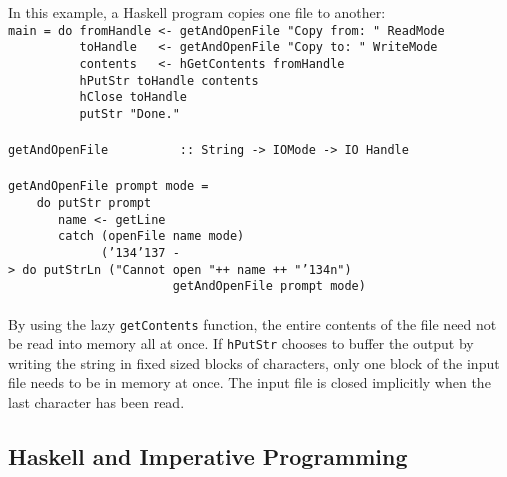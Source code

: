 In this example, a Haskell program copies one file to another:
\bprog
\mbox{\tt main\ =\ do\ fromHandle\ <-\ getAndOpenFile\ "Copy\ from:\ "\ ReadMode}\\
\mbox{\tt \ \ \ \ \ \ \ \ \ \ toHandle\ \ \ <-\ getAndOpenFile\ "Copy\ to:\ "\ WriteMode\ }\\
\mbox{\tt \ \ \ \ \ \ \ \ \ \ contents\ \ \ <-\ hGetContents\ fromHandle}\\
\mbox{\tt \ \ \ \ \ \ \ \ \ \ hPutStr\ toHandle\ contents}\\
\mbox{\tt \ \ \ \ \ \ \ \ \ \ hClose\ toHandle}\\
\mbox{\tt \ \ \ \ \ \ \ \ \ \ putStr\ "Done."}\\
\mbox{\tt }\\[-8pt]
\mbox{\tt getAndOpenFile\ \ \ \ \ \ \ \ \ \ ::\ String\ ->\ IOMode\ ->\ IO\ Handle}\\
\mbox{\tt }\\[-8pt]
\mbox{\tt getAndOpenFile\ prompt\ mode\ =}\\
\mbox{\tt \ \ \ \ do\ putStr\ prompt}\\
\mbox{\tt \ \ \ \ \ \ \ name\ <-\ getLine}\\
\mbox{\tt \ \ \ \ \ \ \ catch\ (openFile\ name\ mode)}\\
\mbox{\tt \ \ \ \ \ \ \ \ \ \ \ \ \ ({\char'134}{\char'137}\ ->\ do\ putStrLn\ ("Cannot\ open\ "++\ name\ ++\ "{\char'134}n")}\\
\mbox{\tt \ \ \ \ \ \ \ \ \ \ \ \ \ \ \ \ \ \ \ \ \ \ \ getAndOpenFile\ prompt\ mode)}\\
\mbox{\tt }\\[-8pt]
\mbox{\tt }
\eprog
By using the lazy \mbox{\tt getContents} function, the entire contents of the
file need not be read into memory all at once.  If \mbox{\tt hPutStr} chooses
to buffer the output by writing the string in fixed sized blocks of
characters, only one block of the input file needs to be in memory at
once.  The input file is closed implicitly when the last character has
been read.

\subsection{Haskell and Imperative Programming}

